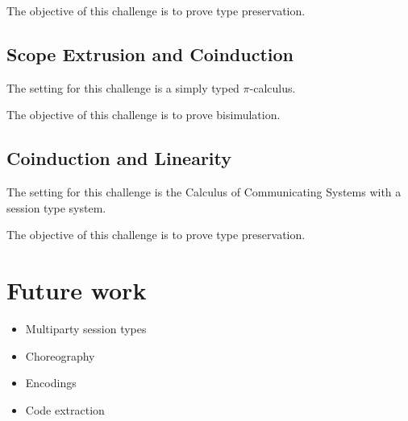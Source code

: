 \documentclass[a4paper]{article}
\begin{document}
The objective of this challenge is to prove type preservation.

\subsection{Scope Extrusion and Coinduction}
The setting for this challenge is a simply typed \( \pi \)-calculus.

The objective of this challenge is to prove bisimulation.

\subsection{Coinduction and Linearity}
The setting for this challenge is the Calculus of Communicating Systems with a session type system.

The objective of this challenge is to prove type preservation.

\section{Future work}
\begin{itemize}
\item Multiparty session types
\item Choreography
\item Encodings
\item Code extraction
\end{itemize}
\end{document}
